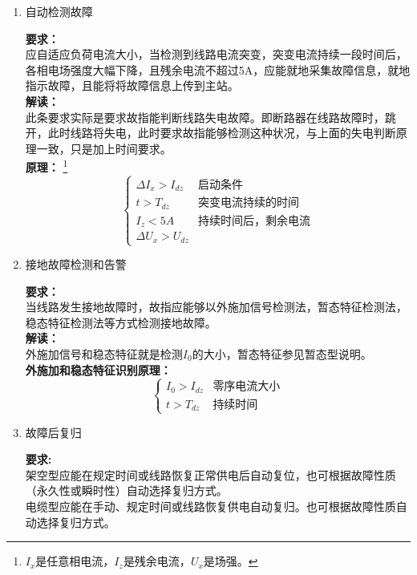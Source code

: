 \documentclass{article}
\begin{document}
\begin{CJK}{UTF8}{gbsn}
\begin{enumerate}
\item	自动检测故障
\par
	\textbf{要求：}\\应自适应负荷电流大小，当检测到线路电流突变，突变电流持续一段时间后，各相电场强度大幅下降，且残余电流不超过5A，应能就地采集故障信息，就地指示故障，且能将将故障信息上传到主站。\\
	\textbf{解读：}\\此条要求实际是要求故指能判断线路失电故障。即断路器在线路故障时，跳开，此时线路将失电，此时要求故指能够检测这种状况，与上面的失电判断原理一致，只是加上时间要求。\\
	\textbf{原理：}
	\footnote{$I_x$是任意相电流，$I_z$是残余电流，$U_x$是场强。}
	\begin{equation}	
		\left\{ \begin{array}{ll}
				\Delta I_x>I_{dz} & \textrm{启动条件}\\
			    t>T_{dz} & \textrm{突变电流持续的时间}\\
				I_z<5A & \textrm{持续时间后，剩余电流}\\ 
			\Delta U_x>U_{dz}
		\end{array}
		\right .
	\end{equation}
\item	接地故障检测和告警
	\par
	\textbf{要求：}\\当线路发生接地故障时，故指应能够以外施加信号检测法，暂态特征检测法，稳态特征检测法等方式检测接地故障。\\
	\textbf{解读：}	\\外施加信号和稳态特征就是检测$I_0$的大小，暂态特征参见暂态型说明。\\
	\textbf{外施加和稳态特征识别原理：}\\
	\begin{equation}
		\left\{
			\begin{array}{ll}
				I_0>I_{dz} & \textrm{零序电流大小}\\
				  t>T_{dz} & \textrm{持续时间}
			\end{array}
			\right.
	\end{equation}
\item	故障后复归
	\par
	\textbf{要求:}\\
	架空型应能在规定时间或线路恢复正常供电后自动复位，也可根据故障性质（永久性或瞬时性）自动选择复归方式。\\
	电缆型应能在手动、规定时间或线路恢复供电自动复归。也可根据故障性质自动选择复归方式。\\

\end{enumerate}
\end{CJK}
\end{document}

